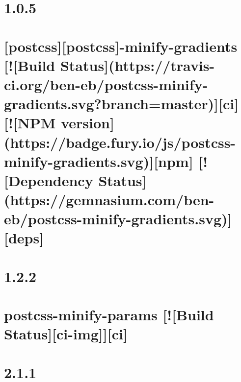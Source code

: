 \documentclass[twoside]{book}
\newcommand{\+}{\discretionary{\mbox{\scriptsize$\hookleftarrow$}}{}{}}
\begin{document}
\chapter{1.0.5}
\label{md__c_1_workspace_demo_src_main_script_node_modules_postcss-minify-gradients__c_h_a_n_g_e_l_o_g}

\chapter{\mbox{[}postcss\mbox{]}\mbox{[}postcss\mbox{]}-\/minify-\/gradients \mbox{[}!\mbox{[}Build Status\mbox{]}(https\+://travis-\/ci.org/ben-\/eb/postcss-\/minify-\/gradients.svg?branch=master)\mbox{]}\mbox{[}ci\mbox{]} \mbox{[}!\mbox{[}N\+PM version\mbox{]}(https\+://badge.fury.\+io/js/postcss-\/minify-\/gradients.svg)\mbox{]}\mbox{[}npm\mbox{]} \mbox{[}!\mbox{[}Dependency Status\mbox{]}(https\+://gemnasium.com/ben-\/eb/postcss-\/minify-\/gradients.svg)\mbox{]}\mbox{[}deps\mbox{]}}
\label{md__c_1_workspace_demo_src_main_script_node_modules_postcss-minify-gradients__r_e_a_d_m_e}

\chapter{1.2.2}
\label{md__c_1_workspace_demo_src_main_script_node_modules_postcss-minify-params__c_h_a_n_g_e_l_o_g}

\chapter{postcss-\/minify-\/params \mbox{[}!\mbox{[}Build Status\mbox{]}\mbox{[}ci-\/img\mbox{]}\mbox{]}\mbox{[}ci\mbox{]}}
\label{md__c_1_workspace_demo_src_main_script_node_modules_postcss-minify-params__r_e_a_d_m_e}

\chapter{2.1.1}
\label{md__c_1_workspace_demo_src_main_script_node_modules_postcss-minify-selectors__c_h_a_n_g_e_l_o_g}

\end{document}
